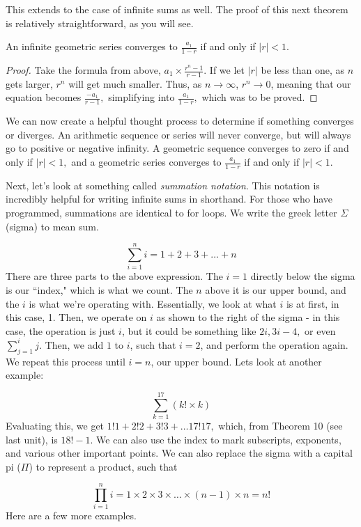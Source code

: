 \documentclass[11pt]{article}
\begin{document}
This extends to the case of infinite sums as well. The proof of this next theorem is relatively straightforward, as you will see.

\begin{thrm}
	An infinite geometric series converges to $\frac{a_1}{1-r}$ if and only if $|r| < 1$.
\end{thrm}
\begin{proof}
	Take the formula from above, $a_1\times\frac{r^n-1}{r-1}$. If we let $|r|$ be less than one, as $n$ gets larger, $r^n$ will get much smaller. Thus, as $n \rightarrow \infty$, $r^n \rightarrow 0$, meaning that our equation becomes $\frac{-a_1}{r-1},$ simplifying into $\frac{a_1}{1-r},$ which was to be proved.
\end{proof}

We can now create a helpful thought process to determine if something converges or diverges. An arithmetic sequence or series will never converge, but will always go to positive or negative infinity. A geometric sequence converges to zero if and only if $|r| < 1,$ and a geometric series converges to $\frac{a_1}{1-r}$ if and only if $|r| < 1$.

Next, let's look at something called \textit{summation notation}. This notation is incredibly helpful for writing infinite sums in shorthand. For those who have programmed, summations are identical to for loops. We write the greek letter $\Sigma$ (sigma) to mean sum.

\[\sum_{i=1}^n i = 1 + 2 + 3 + \dots + n\]
There are three parts to the above expression. The $i=1$ directly below the sigma is our ``index," which is what we count. The $n$ above it is our upper bound, and the $i$ is what we're operating with. Essentially, we look at what $i$ is at first, in this case, 1. Then, we operate on $i$ as shown to the right of the sigma - in this case, the operation is just $i$, but it could be something like $2i, 3i - 4,$ or even $\sum\limits_{j=1}^i j$. Then, we add $1$ to $i$, such that $i=2$, and perform the operation again. We repeat this process until $i = n$, our upper bound. Lets look at another example:

\[\sum_{k=1}^{17} (k!\times k)\]
Evaluating this, we get $1!1 + 2!2+ 3!3 + \dots 17!17,$ which, from Theorem 10 (see last unit), is $18! - 1$. We can also use the index to mark subscripts, exponents, and various other important points. We can also replace the sigma with a capital pi ($\Pi$) to represent a product, such that

\[\prod_{i=1}^n i = 1 \times 2 \times 3 \times \dots \times (n-1) \times n = n!\]
Here are a few more examples.
\end{document}
